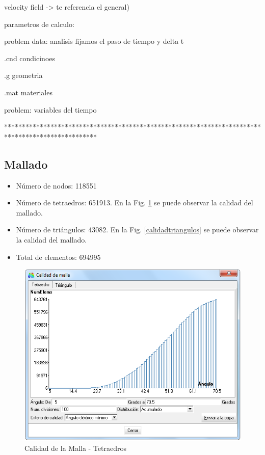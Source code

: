 \documentclass[10pt,a4paper,final]{article}
\begin{document}
velocity field -> te referencia el general)
	
	parametros de calculo:
	
	problem data: analisis fijamos el paso de tiempo y delta t
	
	.cnd condicinoes
	
	.g geometria
	
	.mat materiales
	
	problem: variables del tiempo
	
**************************************************************************************************
%
\subsection{Mallado}
\begin{itemize}
\item Número de nodos: 118551
\item Número de tetraedros: 651913. En la Fig. \ref{calidadtetraedros} se puede observar la calidad del mallado.
\item Número de triángulos: 43082. En la Fig. \ref{calidadtriangulos} se puede observar la calidad del mallado.
\item Total de elementos: 694995
\end{itemize}

\begin{figure}[tbhp]
\centerline{\includegraphics[scale=0.75]{img/cant_tetraedros}}
\caption{Calidad de la Malla - Tetraedros}
\label{calidadtetraedros}
\end{figure}
\end{document}
